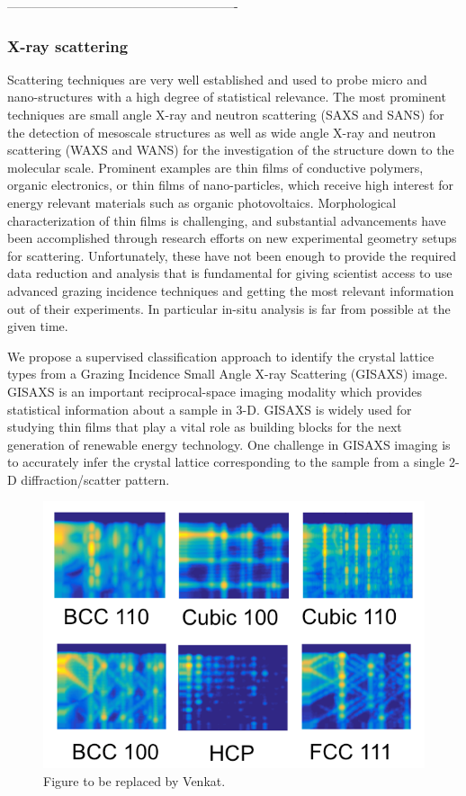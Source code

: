 -------------------------------------------------------
\subsubsection{X-ray scattering}\label{subsec:gisaxs} %
Scattering techniques are very well established and used to probe micro and nano-structures with a high degree of statistical relevance. The most prominent techniques are small angle X-ray and neutron scattering (SAXS and SANS) for the detection of mesoscale structures as well as wide angle X-ray and neutron scattering (WAXS and WANS) for the investigation of the structure down to the molecular scale. Prominent examples are thin films of conductive polymers, organic electronics, or thin films of nano-particles, which receive high interest for energy relevant materials such as organic photovoltaics. Morphological characterization of thin films is challenging, and substantial advancements have been accomplished through research efforts on new experimental geometry setups for scattering. Unfortunately, these have not been enough to provide the required data reduction and analysis that is fundamental for giving scientist access to use advanced grazing incidence techniques and getting the most relevant information out of their experiments. In particular in-situ analysis is far from possible at the given time.

We propose a supervised classification approach to identify the crystal lattice types from a Grazing Incidence Small Angle X-ray Scattering (GISAXS) image. GISAXS is an important reciprocal-space imaging modality which provides statistical information about a sample in 3-D. GISAXS is widely used for
studying thin films that play a vital role as building blocks for the next generation of renewable energy technology. One challenge in GISAXS imaging is to accurately infer the crystal lattice corresponding to the sample from a single 2-D diffraction/scatter pattern.

\begin{figure}[!t]
\centering
\includegraphics[width=\linewidth]{img/gisaxs1.png}
\caption{Figure to be replaced by Venkat.}
\label{fig:gisaxs}
\end{figure}

